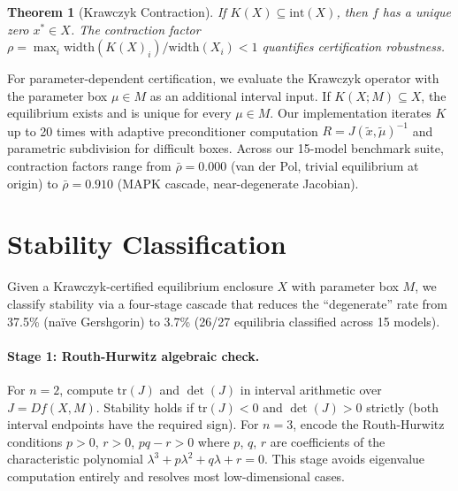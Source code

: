 \documentclass[11pt]{article}
\newtheorem{theorem}{Theorem}
\begin{document}
\begin{theorem}[Krawczyk Contraction]
\label{thm:krawczyk}
If $K(X) \subseteq \mathrm{int}(X)$, then $f$ has a unique zero $x^* \in X$.
The contraction factor $\rho = \max_i \mathrm{width}(K(X)_i) / \mathrm{width}(X_i) < 1$ quantifies certification robustness.
\end{theorem}

For parameter-dependent certification, we evaluate the Krawczyk operator with the parameter box $\mu \in M$ as an additional interval input.
If $K(X; M) \subseteq X$, the equilibrium exists and is unique for every $\mu \in M$.
Our implementation iterates $K$ up to 20 times with adaptive preconditioner computation $R = J(\tilde{x}, \tilde{\mu})^{-1}$ and parametric subdivision for difficult boxes.
Across our 15-model benchmark suite, contraction factors range from $\bar\rho = 0.000$ (van der Pol, trivial equilibrium at origin) to $\bar\rho = 0.910$ (MAPK cascade, near-degenerate Jacobian).

\section{Stability Classification}
\label{sec:stability}

Given a Krawczyk-certified equilibrium enclosure $X$ with parameter box $M$, we classify stability via a four-stage cascade that reduces the ``degenerate'' rate from 37.5\% (na\"ive Gershgorin) to 3.7\% (26/27 equilibria classified across 15 models).

\paragraph{Stage 1: Routh-Hurwitz algebraic check.}
For $n=2$, compute $\mathrm{tr}(J)$ and $\det(J)$ in interval arithmetic over $J = Df(X, M)$.
Stability holds if $\mathrm{tr}(J) < 0$ and $\det(J) > 0$ strictly (both interval endpoints have the required sign).
For $n=3$, encode the Routh-Hurwitz conditions $p > 0$, $r > 0$, $pq - r > 0$ where $p$, $q$, $r$ are coefficients of the characteristic polynomial $\lambda^3 + p\lambda^2 + q\lambda + r = 0$.
This stage avoids eigenvalue computation entirely and resolves most low-dimensional cases.
\end{document}

